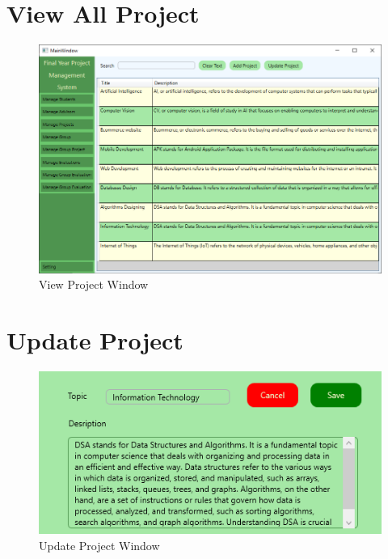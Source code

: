 \documentclass[a4paper, 12pt, oneside]{uet_thesis}
\begin{document}
\section{View All Project}
\begin{figure}[h]
    \centering
    \includegraphics[width=1\textwidth]{Figures/ViewProject.png}
    \caption{View Project Window}
    \label{fig:my_label}
\end{figure}
\clearpage

\section{Update Project}
\begin{figure}[h]
    \centering
    \includegraphics[width=1\textwidth]{Figures/UpdateProject.png}
    \caption{Update Project Window}
    \label{fig:my_label}
\end{figure}
\end{document}
